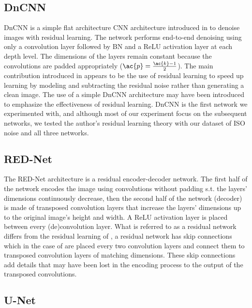 \subsection{DnCNN}
DnCNN is a simple flat architecture \ac{CNN} architecture introduced in \cite{dncnn} to denoise images with residual learning. The network performs end-to-end denoising using only a convolution layer followed by \ac{BN} and a \ac{ReLU} activation layer at each depth level. The dimensions of the layers remain constant because the convolutions are padded appropriately ($\ac{p}={\ac{k}-1\over{2}}$). %
The main contribution introduced in \cite{dncnn} appears to be the use of residual learning to speed up learning by modeling and subtracting the residual noise rather than generating a clean image. The use of a simple DnCNN architecture may have been introduced to emphasize the effectiveness of residual learning. DnCNN is the first network we experimented with, and although most of our experiment focus on the subsequent networks, we tested the author's residual learning theory with our dataset of ISO noise and all three networks.
\subsection{RED-Net}
The \ac{RED-Net} architecture is a residual encoder-decoder network. The first half of the network encodes the image using convolutions without padding s.t. the layers' dimensions continuously decrease, then the second half of the network (decoder) is made of transposed convolution layers that increase the layers' dimensions up to the original image's height and width. A \ac{ReLU} activation layer is placed between every (de)convolution layer. What is referred to as a residual network differs from the residual learning of \cite{dncnn}, a residual network has skip connections which in the case of \cite{rednet} are placed every two convolution layers and connect them to transposed convolution layers of matching dimensions. These skip connections add details that may have been lost in the encoding process to the output of the transposed convolutions. 
\subsection{U-Net}
